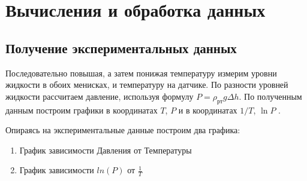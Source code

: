 \documentclass[a4paper,12pt]{article}
\begin{document}
\section{Вычисления и обработка данных}
\subsection{Получение экспериментальных данных}
Последовательно повышая, а затем понижая температуру измерим уровни жидкости в обоих менисках, и температуру на датчике. 
По разности уровней жидкости рассчитаем давление, используя формулу $P = \rho_{рт} g \Delta h$. По полученным данным построим графики в координатах $T$,  $P$  и в координатах $1/T$,  $\ln P$ .

Опираясь на экспериментальные данные построим два графика:
\begin{enumerate}
    \item График зависимости Давления от Температуры
    
\begin{figure}[H!]	
	
\end{figure}
    
    \item График зависимости $ln(P)$ от $\frac{1}{T}$
    
\begin{figure}[H!]	
	
\end{figure}
\end{enumerate}
\end{document}
